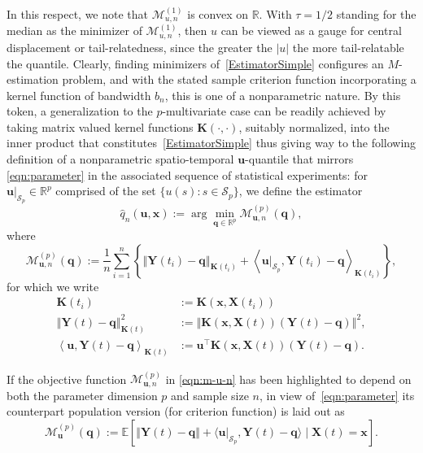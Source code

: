 \documentclass[aos]{imsart}
\theoremstyle{plain}
\theoremstyle{remark}
\def\E{\mathbb{E}}
\def\R{\mathbb{R}}
\newcommand{\Scal}{\mathcal{S}}
\newcommand{\norm}[1]{\left\Vert #1 \right\Vert}
\newcommand{\bb}[1]{\boldsymbol{#1}}
\newcommand{\tr}{^{\intercal}}
\newcommand{\kernel}[1]{\bb{K}(\bb{x}, \bb{X}(#1))}
\begin{document}
In this respect, we note that $\mathcal{M}_{u,n}^{(1)}$ is convex on $\R$. With $\tau= 1/2$ standing for the median as the minimizer of $\mathcal{M}_{u,n}^{(1)}$, then $u$ can be viewed as a gauge for central displacement or tail-relatedness, since the greater the $\vert u\vert$ the more tail-relatable the quantile. Clearly, finding minimizers of~\eqref{EstimatorSimple} configures an $M$-estimation problem, and with the stated sample criterion function incorporating a kernel function of bandwidth $b_n$, this is one of a nonparametric nature. By this token, a generalization to the $p$-multivariate case can be readily achieved by taking matrix valued kernel functions $\bb{K}(\cdot, \cdot)$, suitably normalized, into the inner product that constitutes~\eqref{EstimatorSimple} thus giving way to the following definition of a nonparametric spatio-temporal $\bb{u}$-quantile that mirrors \eqref{eqn:parameter} in the associated sequence of statistical experiments: for $\bb{u}\vert_{\Scal_p} \in \R^p$ comprised of the set $\{ u(s): s \in \Scal_p \}$, we define the estimator
\begin{equation} \label{eqn:estimator}
    \hat{q}_n(\bb{u} ,\bb{x}) := \arg\min_{\bb{q}\in \R^p} \mathcal{M}_{\bb{u},n}^{(p)}(\bb{q}),    
\end{equation}
where 
\begin{equation}
    \mathcal{M}_{\bb{u},n}^{(p)}(\bb{q}):= \frac{1}{n} \sum_{i=1}^n  \left\{\left\Vert \bb{Y}(t_i) - \bb{q}\right\Vert_{\bb{K}(t_i)} + \left\langle\bb{u}\vert_{\Scal_p}, \bb{Y}(t_i) - \bb{q} \right\rangle_{\bb{K}(t_i)} \right\},
    \label{eqn:m-u-n}
\end{equation}
for which we write
\begin{align*}
    \bb{K}(t_i) & := \kernel{t_i}\\
    \left\Vert \bb{Y}(t) - \bb{q}\right\Vert_{\bb{K}(t)}^2 
    & := \norm{\kernel{t}(\bb{Y}(t) - \bb{q})}^2,\\
    \left\langle\bb{u}, \bb{Y}(t) - \bb{q} \right\rangle_{\bb{K}(t)} 
    & := \bb{u}\tr \kernel{t} (\bb{Y}(t) - \bb{q}).
\end{align*}

If the objective function $\mathcal{M}_{\bb{u}, n}^{(p)}$ in \eqref{eqn:m-u-n} has been highlighted to depend on both the parameter dimension $p$ and sample size $n$, in view of~\eqref{eqn:parameter} its counterpart population version (for criterion function) is laid out as
\begin{equation*}
    \mathcal{M}_{\bb{u}}^{(p)}(\bb{q}) := \E\left[ \Vert \bb{Y}(t) - \bb{q}\Vert +  \langle \bb{u}\vert_{\Scal_p}, \bb{Y}(t) - \bb{q} \rangle \mid \bb{X}(t) = \bb{x}\right].
\end{equation*}
\end{document}
